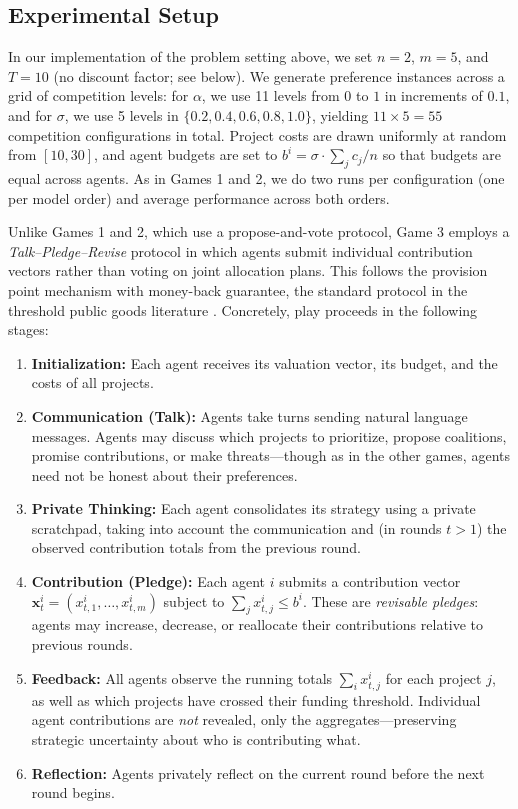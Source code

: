 \subsection{Experimental Setup}
\label{sec:game_3_experimental_setup}

In our implementation of the problem setting above, we set $n = 2$, $m = 5$, and $T = 10$ (no discount factor; see below).
We generate preference instances across a grid of competition levels: for $\alpha$, we use 11 levels from $0$ to $1$ in increments of $0.1$, and for $\sigma$, we use 5 levels in $\{0.2, 0.4, 0.6, 0.8, 1.0\}$, yielding $11 \times 5 = 55$ competition configurations in total.
Project costs are drawn uniformly at random from $[10, 30]$, and agent budgets are set to $b^i = \sigma \cdot \sum_j c_j / n$ so that budgets are equal across agents.
As in Games 1 and 2, we do two runs per configuration (one per model order) and average performance across both orders.

Unlike Games 1 and 2, which use a propose-and-vote protocol, Game 3 employs a \emph{Talk--Pledge--Revise} protocol in which agents submit individual contribution vectors rather than voting on joint allocation plans.
This follows the provision point mechanism with money-back guarantee, the standard protocol in the threshold public goods literature \citep{bagnoli1989provision}.
Concretely, play proceeds in the following stages:

\begin{enumerate}
    \item \textbf{Initialization:} Each agent receives its valuation vector, its budget, and the costs of all projects.
    \item \textbf{Communication (Talk):} Agents take turns sending natural language messages. Agents may discuss which projects to prioritize, propose coalitions, promise contributions, or make threats---though as in the other games, agents need not be honest about their preferences.
    \item \textbf{Private Thinking:} Each agent consolidates its strategy using a private scratchpad, taking into account the communication and (in rounds $t > 1$) the observed contribution totals from the previous round.
    \item \textbf{Contribution (Pledge):} Each agent $i$ submits a contribution vector $\bm{x}^i_t = (x^i_{t,1}, \ldots, x^i_{t,m})$ subject to $\sum_j x^i_{t,j} \leq b^i$. These are \emph{revisable pledges}: agents may increase, decrease, or reallocate their contributions relative to previous rounds.
    \item \textbf{Feedback:} All agents observe the running totals $\sum_i x^i_{t,j}$ for each project $j$, as well as which projects have crossed their funding threshold. Individual agent contributions are \emph{not} revealed, only the aggregates---preserving strategic uncertainty about who is contributing what.
    \item \textbf{Reflection:} Agents privately reflect on the current round before the next round begins.
\end{enumerate}

